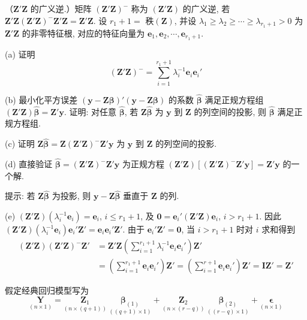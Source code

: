 \medskip
{}\quad （$\mathbf{Z}'\mathbf{Z}$ 的广义逆.）矩阵 $(\mathbf{Z}'\mathbf{Z})^-$ 称为 $(\mathbf{Z}'\mathbf{Z})$ 的广义逆, 若 $\mathbf{Z}'\mathbf{Z}(\mathbf{Z}'\mathbf{Z})^-\mathbf{Z}'\mathbf{Z}=\mathbf{Z}'\mathbf{Z}$. 设 $r_1+1=$ 秩$(\mathbf{Z})$, 并设 $\lambda_1\geqslant\lambda_2\geqslant\cdots\geqslant\lambda_{r_1+1}>0$ 为 $\mathbf{Z}'\mathbf{Z}$ 的非零特征根, 对应的特征向量为 $\mathbf{e}_1,\mathbf{e}_2,\cdots,\mathbf{e}_{r_1+1}$.

\noindent (a) 证明
\[
(\mathbf{Z}'\mathbf{Z})^-=\sum_{i=1}^{r_1+1}\lambda_i^{-1}\mathbf{e}_i\mathbf{e}_i'
\]

\noindent (b) 最小化平方误差 $(\mathbf{y}-\mathbf{Z}\boldsymbol{\beta})'(\mathbf{y}-\mathbf{Z}\boldsymbol{\beta})$ 的系数 $\hat{\boldsymbol{\beta}}$ 满足正规方程组 $(\mathbf{Z}'\mathbf{Z})\hat{\boldsymbol{\beta}}=\mathbf{Z}'\mathbf{y}$. 证明: 对任意 $\hat{\boldsymbol{\beta}}$, 若 $\mathbf{Z}\hat{\boldsymbol{\beta}}$ 为 $\mathbf{y}$ 到 $\mathbf{Z}$ 的列空间的投影, 则 $\hat{\boldsymbol{\beta}}$ 满足正规方程组.

\noindent (c) 证明 $\mathbf{Z}\hat{\boldsymbol{\beta}}=\mathbf{Z}(\mathbf{Z}'\mathbf{Z})^-\mathbf{Z}'\mathbf{y}$ 为 $\mathbf{y}$ 到 $\mathbf{Z}$ 的列空间的投影.

\noindent (d) 直接验证 $\hat{\boldsymbol{\beta}}=(\mathbf{Z}'\mathbf{Z})^-\mathbf{Z}'\mathbf{y}$ 为正规方程 $(\mathbf{Z}'\mathbf{Z})[(\mathbf{Z}'\mathbf{Z})^-\mathbf{Z}'\mathbf{y}]=\mathbf{Z}'\mathbf{y}$ 的一个解.

提示: 若 $\mathbf{Z}\hat{\boldsymbol{\beta}}$ 为投影, 则 $\mathbf{y}-\mathbf{Z}\hat{\boldsymbol{\beta}}$ 垂直于 $\mathbf{Z}$ 的列.

\noindent (e) $(\mathbf{Z}'\mathbf{Z})(\lambda_i^{-1}\mathbf{e}_i)=\mathbf{e}_i$, $i\leqslant r_1+1$, 及 $\mathbf{0}=\mathbf{e}_i'(\mathbf{Z}'\mathbf{Z})\mathbf{e}_i$, $i>r_1+1$. 因此 $(\mathbf{Z}'\mathbf{Z})(\lambda_i^{-1}\mathbf{e}_i)\mathbf{e}_i'\mathbf{Z}'=\mathbf{e}_i\mathbf{e}_i'\mathbf{Z}'$. 由于 $\mathbf{e}_i'\mathbf{Z}'=\mathbf{0}$, 当 $i>r_1+1$ 时对 $i$ 求和得到
\[
\begin{aligned}
(\mathbf{Z}'\mathbf{Z})(\mathbf{Z}'\mathbf{Z})^-\mathbf{Z}'
&=\mathbf{Z}'\mathbf{Z}\left(\sum_{i=1}^{r_1+1}\lambda_i^{-1}\mathbf{e}_i\mathbf{e}_i'\right)\mathbf{Z}'\\
&=\left(\sum_{i=1}^{r_1+1}\mathbf{e}_i\mathbf{e}_i'\right)\mathbf{Z}'
=\left(\sum_{i=1}^{r+1}\mathbf{e}_i\mathbf{e}_i'\right)\mathbf{Z}'
=\mathbf{I}\mathbf{Z}'=\mathbf{Z}'
\end{aligned}
\]

\medskip
{}\quad 假定经典回归模型写为
\[
\underset{(n\times 1)}{\mathbf{Y}}=\underset{(n\times(q+1))}{\mathbf{Z}_1}\ \underset{((q+1)\times 1)}{\boldsymbol{\beta}_{(1)}}
+\underset{(n\times(r-q))}{\mathbf{Z}_2}\ \underset{((r-q)\times 1)}{\boldsymbol{\beta}_{(2)}}
+\underset{(n\times 1)}{\boldsymbol{\epsilon}}
\]

